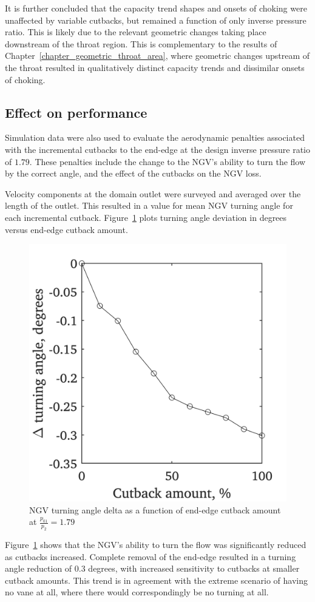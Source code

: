 \documentclass[a4paper, 11pt, oneside]{report}
\begin{document}
It is further concluded that the capacity trend shapes and onsets of choking were unaffected by variable cutbacks, but remained a function of only inverse pressure ratio. This is likely due to the relevant geometric changes taking place downstream of the throat region. This is complementary to the results of Chapter~\ref{chapter_geometric_throat_area}, where geometric changes upstream of the throat resulted in qualitatively distinct capacity trends and dissimilar onsets of choking.

\subsection{Effect on performance}

Simulation data were also used to evaluate the aerodynamic penalties associated with the incremental cutbacks to the end-edge at the design inverse pressure ratio of $1.79$. These penalties include the change to the NGV's ability to turn the flow by the correct angle, and the effect of the cutbacks on the NGV loss.

Velocity components at the domain outlet were surveyed and averaged over the length of the outlet. This resulted in a value for mean NGV turning angle for each incremental cutback. Figure~\ref{fig:ss_cutbacks_vs_turning_angles} plots turning angle deviation in degrees versus end-edge cutback amount.

\begin{figure}[H]
	\centering
	\includegraphics[width=.45\textwidth]{figs/ss_cutbacks_vs_turning_angles.png}
	\caption{NGV turning angle delta as a function of end-edge cutback amount at $\frac{p_{01}}{p_2}=1.79$}
    \label{fig:ss_cutbacks_vs_turning_angles}
\end{figure}

Figure~\ref{fig:ss_cutbacks_vs_turning_angles} shows that the NGV's ability to turn the flow was significantly reduced as cutbacks increased. Complete removal of the end-edge resulted in a turning angle reduction of $0.3$ degrees, with increased sensitivity to cutbacks at smaller cutback amounts. This trend is in agreement with the extreme scenario of having no vane at all, where there would correspondingly be no turning at all.
\end{document}

